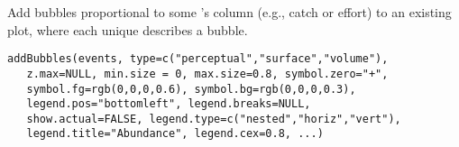 \documentclass[letterpaper]{book}
\begin{document}
%
\begin{Description}\relax
Add bubbles proportional to some 's  column
(e.g., catch or effort) to an existing plot, where each unique
 describes a bubble.
\end{Description}
%
\begin{Usage}
\begin{verbatim}
addBubbles(events, type=c("perceptual","surface","volume"),
   z.max=NULL, min.size = 0, max.size=0.8, symbol.zero="+",
   symbol.fg=rgb(0,0,0,0.6), symbol.bg=rgb(0,0,0,0.3),
   legend.pos="bottomleft", legend.breaks=NULL,
   show.actual=FALSE, legend.type=c("nested","horiz","vert"),
   legend.title="Abundance", legend.cex=0.8, ...)
\end{verbatim}
\end{Usage}
%
\end{document}
